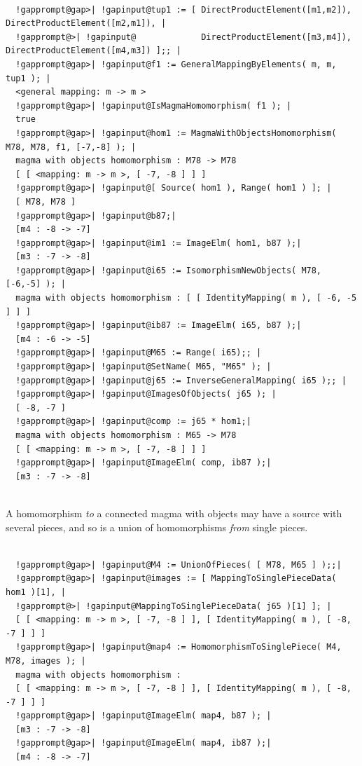 \documentclass[a4paper,11pt]{report}
\begin{document}
{{{ }

 
\begin{Verbatim}[commandchars=!@|,fontsize=\small,frame=single,label=Example]
  
  !gapprompt@gap>| !gapinput@tup1 := [ DirectProductElement([m1,m2]), DirectProductElement([m2,m1]), |
  !gapprompt@>| !gapinput@             DirectProductElement([m3,m4]), DirectProductElement([m4,m3]) ];; |
  !gapprompt@gap>| !gapinput@f1 := GeneralMappingByElements( m, m, tup1 ); |
  <general mapping: m -> m >
  !gapprompt@gap>| !gapinput@IsMagmaHomomorphism( f1 ); |
  true
  !gapprompt@gap>| !gapinput@hom1 := MagmaWithObjectsHomomorphism( M78, M78, f1, [-7,-8] ); |
  magma with objects homomorphism : M78 -> M78
  [ [ <mapping: m -> m >, [ -7, -8 ] ] ]
  !gapprompt@gap>| !gapinput@[ Source( hom1 ), Range( hom1 ) ]; |
  [ M78, M78 ]
  !gapprompt@gap>| !gapinput@b87;|
  [m4 : -8 -> -7]
  !gapprompt@gap>| !gapinput@im1 := ImageElm( hom1, b87 );|
  [m3 : -7 -> -8]
  !gapprompt@gap>| !gapinput@i65 := IsomorphismNewObjects( M78, [-6,-5] ); |
  magma with objects homomorphism : [ [ IdentityMapping( m ), [ -6, -5 ] ] ]
  !gapprompt@gap>| !gapinput@ib87 := ImageElm( i65, b87 );|
  [m4 : -6 -> -5]
  !gapprompt@gap>| !gapinput@M65 := Range( i65);; |
  !gapprompt@gap>| !gapinput@SetName( M65, "M65" ); |
  !gapprompt@gap>| !gapinput@j65 := InverseGeneralMapping( i65 );; |
  !gapprompt@gap>| !gapinput@ImagesOfObjects( j65 ); |
  [ -8, -7 ]
  !gapprompt@gap>| !gapinput@comp := j65 * hom1;|
  magma with objects homomorphism : M65 -> M78
  [ [ <mapping: m -> m >, [ -7, -8 ] ] ]
  !gapprompt@gap>| !gapinput@ImageElm( comp, ib87 );|
  [m3 : -7 -> -8]
  
\end{Verbatim}
 A homomorphism \emph{to} a connected magma with objects may have a source with several pieces, and so
is a union of homomorphisms \emph{from} single pieces. 

 
\begin{Verbatim}[commandchars=!@|,fontsize=\small,frame=single,label=Example]
  
  !gapprompt@gap>| !gapinput@M4 := UnionOfPieces( [ M78, M65 ] );;|
  !gapprompt@gap>| !gapinput@images := [ MappingToSinglePieceData( hom1 )[1], |
  !gapprompt@>| !gapinput@MappingToSinglePieceData( j65 )[1] ]; |
  [ [ <mapping: m -> m >, [ -7, -8 ] ], [ IdentityMapping( m ), [ -8, -7 ] ] ]
  !gapprompt@gap>| !gapinput@map4 := HomomorphismToSinglePiece( M4, M78, images ); |
  magma with objects homomorphism : 
  [ [ <mapping: m -> m >, [ -7, -8 ] ], [ IdentityMapping( m ), [ -8, -7 ] ] ]
  !gapprompt@gap>| !gapinput@ImageElm( map4, b87 ); |
  [m3 : -7 -> -8]
  !gapprompt@gap>| !gapinput@ImageElm( map4, ib87 );|
  [m4 : -8 -> -7]
  

\end{Verbatim}}}
\end{document}
